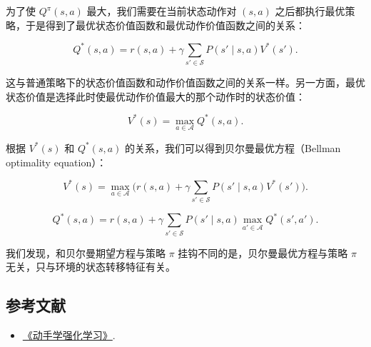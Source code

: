 为了使 \(Q^{\pi}(s,a)\) 最大，我们需要在当前状态动作对 \((s,a)\) 之后都执行最优策略，于是得到了最优状态价值函数和最优动作价值函数之间的关系：

\[
Q^{*}(s,a)=r(s,a)+\gamma\sum_{s'\in\mathcal{S}}P(s'\mid s,a)V^{*}(s').
\]

这与普通策略下的状态价值函数和动作价值函数之间的关系一样。另一方面，最优状态价值是选择此时使最优动作价值最大的那个动作时的状态价值：

\[
V^{*}(s)=\max_{a\in\mathcal{A}}Q^{*}(s,a).
\]

根据 \(V^{*}(s)\) 和 \(Q^{*}(s,a)\) 的关系，我们可以得到贝尔曼最优方程（Bellman optimality equation）：

\[
V^{*}(s)=\max_{a\in\mathcal{A}}\bigl(r(s,a)+\gamma\sum_{s'\in\mathcal{S}}P(s'\mid s,a)V^{*}(s')\bigr).
\]

\[
Q^{*}(s,a)=r(s,a)+\gamma\sum_{s'\in\mathcal{S}}P(s'\mid s,a)
\max_{a'\in\mathcal{A}}Q^{*}(s',a').
\]

我们发现，和贝尔曼期望方程与策略 \(\pi\) 挂钩不同的是，贝尔曼最优方程与策略 \(\pi\) 无关，只与环境的状态转移特征有关。

\FloatBarrier
{}
\hypertarget{ux53c2ux8003ux6587ux732e-43}{%
\subsection{参考文献}\label{ux53c2ux8003ux6587ux732e-43}}

\vspace{0.25em}
\begin{itemize}
\tightlist
\item
  \href{https://hrl.boyuai.com/}{《动手学强化学习》}.
\end{itemize}

\clearpage
